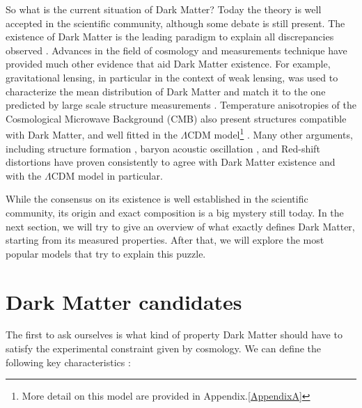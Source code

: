 So what is the current situation of Dark Matter? Today the theory is well accepted in the scientific community, although some debate is still present. The existence of Dark Matter is the leading paradigm to explain all discrepancies observed \cite{hooper}. Advances in the field of cosmology and measurements technique have provided much other evidence that aid Dark Matter existence. For example, gravitational lensing, in particular in the context of weak lensing, was used to characterize the mean distribution of Dark Matter and match it to the one predicted by large scale structure measurements \cite{weak-lensing}. Temperature anisotropies of the Cosmological Microwave Background (CMB) also present structures compatible with Dark Matter, and well fitted in the $\Lambda$CDM model\footnote{More detail on this model are provided in Appendix.\ref{AppendixA}} \cite{Ade:2015xua}. Many other arguments, including structure formation \cite{Navarro:1995iw}, baryon acoustic oscillation \cite{bao}, and Red-shift distortions \cite{Peacock2001} have proven consistently to agree with Dark Matter existence and with the $\Lambda$CDM model in particular.

While the consensus on its existence is well established in the scientific community, its origin and exact composition is a big mystery still today. In the next section, we will try to give an overview of what exactly defines Dark Matter, starting from its measured properties. After that, we will explore the most popular models that try to explain this puzzle.

\section{Dark Matter candidates}
\label{ch1:sec:dm-candidates}

The first to ask ourselves is what kind of property Dark Matter should have to satisfy the experimental constraint given by cosmology. We can define the following key characteristics \cite{Profumo:2019ujg}:


